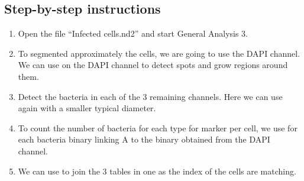 \subsection*{Step-by-step instructions}
\begin{enumerate}
    \item Open the file ``Infected cells.nd2'' and start General Analysis 3.
    \item To segmented approximately the cells, we are going to use the DAPI channel. We can use   on the DAPI channel to detect spots and grow regions around them.
    \item Detect the bacteria in each of the 3 remaining channels. Here we can use again   with a smaller typical diameter.
    \item To count the number of bacteria for each type for marker per cell, we use  for each bacteria binary linking A to the binary obtained from the DAPI channel.
    \item We can use  to join the 3 tables in one as the index of the cells are matching.
\end{enumerate}


